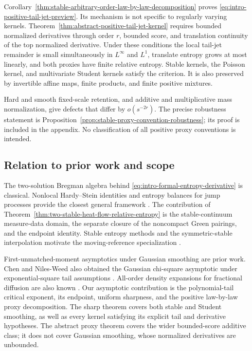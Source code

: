 Corollary~\ref{thm:stable-arbitrary-order-law-by-law-decomposition} proves
\eqref{eq:intro-positive-tail-jet-preview}.  Its mechanism is not specific to
regularly varying kernels.  Theorem~\ref{thm:abstract-positive-tail-jet-kernel}
requires bounded normalized derivatives through order \(r\), bounded score,
and translation continuity of the top normalized derivative.  Under these
conditions the local tail-jet remainder is small simultaneously in
\(L^\infty\) and \(L^1\), translate entropy grows at most linearly, and both
proxies have finite relative entropy.  Stable kernels, the Poisson kernel,
and multivariate Student kernels satisfy the criterion.  It is also preserved
by invertible affine maps, finite products, and finite positive mixtures.

Hard and smooth fixed-scale retention, and additive and multiplicative mass
normalization, give defects that differ by \(o(s^{-2r})\).  The precise
robustness statement is Proposition~\ref{prop:stable-proxy-convention-robustness};
its proof is included in the appendix.  No classification of all positive
proxy conventions is intended.

\newpage
\subsection*{Relation to prior work and scope}

The two-solution Bregman algebra behind
\eqref{eq:intro-formal-entropy-derivative} is classical.  Nonlocal
Hardy--Stein identities and entropy balances for jump processes provide the
closest general framework
\cite{BanuelosBogdanLuks2016HardyStein,Gutowski2023HardySteinPureJump,
KlimsiakRozkosz2025ConditionalHardyStein}.  The contribution of
Theorem~\ref{thm:two-stable-heat-flow-relative-entropy} is the
stable-continuum measure-data domain, the separate closure of the noncompact
Green pairings, and the endpoint identity.  Stable entropy methods and the
symmetric-stable interpolation motivate the moving-reference specialization
\cite{BobkovChistyakovGotze2013StableEntropy,Johnson2013StableDeBruijn,
Toscani2016StableEntropy}.

First-unmatched-moment asymptotics under Gaussian smoothing are prior work.
Chen and Niles-Weed also obtained the Gaussian chi-square asymptotic under
exponential-square tail assumptions
\cite[Theorem~2.5]{ChenNilesWeed2022SmoothedWasserstein}.
All-order density expansions for fractional diffusion are also known
\cite{IshigeKawakamiMichihisa2017,
IshigeKawakamiMichihisa2022RefinedFractional}.  Our asymptotic contribution is
the polynomial-tail critical exponent, its endpoint, uniform sharpness, and
the positive law-by-law proxy decomposition.  The sharp theorem covers both
stable and Student smoothing, as well as every kernel satisfying its explicit
tail and derivative hypotheses.  The abstract proxy theorem covers the wider
bounded-score additive class; it does not cover Gaussian smoothing, whose
normalized derivatives are unbounded.

